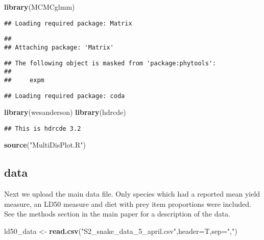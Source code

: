 \documentclass[]{article}
\newenvironment{Shaded}{\begin{snugshade}}{\end{snugshade}}
\newcommand{\KeywordTok}[1]{\textcolor[rgb]{0.13,0.29,0.53}{\textbf{#1}}}
\newcommand{\DataTypeTok}[1]{\textcolor[rgb]{0.13,0.29,0.53}{#1}}
\newcommand{\StringTok}[1]{\textcolor[rgb]{0.31,0.60,0.02}{#1}}
\newcommand{\NormalTok}[1]{#1}
\begin{document}
\begin{Shaded}
\begin{Highlighting}[]
\KeywordTok{library}\NormalTok{(MCMCglmm)}
\end{Highlighting}
\end{Shaded}

\begin{verbatim}
## Loading required package: Matrix
\end{verbatim}

\begin{verbatim}
## 
## Attaching package: 'Matrix'
\end{verbatim}

\begin{verbatim}
## The following object is masked from 'package:phytools':
## 
##     expm
\end{verbatim}

\begin{verbatim}
## Loading required package: coda
\end{verbatim}

\begin{Shaded}
\begin{Highlighting}[]
\KeywordTok{library}\NormalTok{(wesanderson)}
\KeywordTok{library}\NormalTok{(hdrcde)}
\end{Highlighting}
\end{Shaded}

\begin{verbatim}
## This is hdrcde 3.2
\end{verbatim}

\begin{Shaded}
\begin{Highlighting}[]
\KeywordTok{source}\NormalTok{(}\StringTok{"MultiDisPlot.R"}\NormalTok{)}
\end{Highlighting}
\end{Shaded}

\subsection{data}\label{data}

Next we upload the main data file. Only species which had a reported
mean yield measure, an LD50 measure and diet with prey item proportions
were included. See the methods section in the main paper for a
description of the data.

\begin{Shaded}
\begin{Highlighting}[]
\NormalTok{ld50_data <-}\StringTok{ }\KeywordTok{read.csv}\NormalTok{(}\StringTok{"S2_snake_data_5_april.csv"}\NormalTok{,}\DataTypeTok{header=}\NormalTok{T,}\DataTypeTok{sep=}\StringTok{","}\NormalTok{)}
\end{Highlighting}
\end{Shaded}
\end{document}
